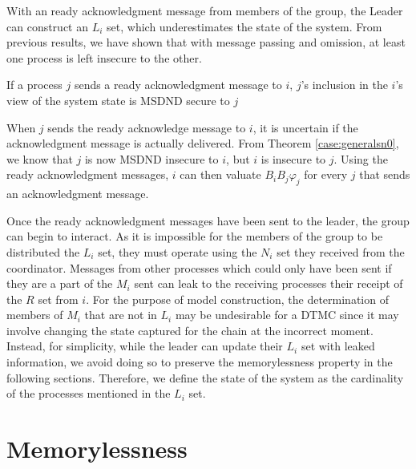 With an ready acknowledgment message from members of the group, the Leader can construct an $L_i$ set, which underestimates the state of the system.
From previous results, we have shown that with message passing and omission, at least one process is left insecure to the other.

\begin{thm}
    If a process $j$ sends a ready acknowledgment message to $i$, $j$'s inclusion in the $i$'s view of the system state is MSDND secure to $j$
\end{thm}

When $j$ sends the ready acknowledge message to $i$, it is uncertain if the acknowledgment message is actually delivered.
From Theorem \ref{case:generalsn0}, we know that $j$ is now MSDND insecure to $i$, but $i$ is insecure to $j$.
Using the ready acknowledgment messages, $i$ can then valuate $B_i B_j \varphi_j$ for every $j$ that sends an acknowledgment message.

Once the ready acknowledgment messages have been sent to the leader, the group can begin to interact.
As it is impossible for the members of the group to be distributed the $L_i$ set, they must operate using the $N_i$ set they received from the coordinator.
Messages from other processes which could only have been sent if they are a part of the $M_i$ sent can leak to the receiving processes their receipt of the $R$ set from $i$.
For the purpose of model construction, the determination of members of $M_i$ that are not in $L_i$ may be undesirable for a \ac{DTMC} since it may involve changing the state captured for the chain at the incorrect moment.
Instead, for simplicity, while the leader can update their $L_i$ set with leaked information, we avoid doing so to preserve the memorylessness property in the following sections.
Therefore, we define the state of the system as the cardinality of the processes mentioned in the $L_i$ set.



\section{Memorylessness}

